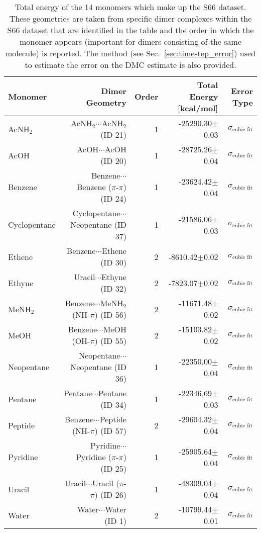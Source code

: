 \begin{table}
\caption{\label{tab:monomer_tot_ene}Total energy of the 14 monomers which make up the S66 dataset. These geometries are taken from specific dimer complexes within the S66 dataset that are identified in the table and the order in which the monomer appears (important for dimers consisting of the same molecule) is reported. The method (see Sec.~\ref{sec:timestep_error}) used to estimate the error on the DMC estimate is also provided.}
\begin{adjustbox}{center}
\begin{tabular}{lrrrr}
\toprule
Monomer & Dimer Geometry & Order & Total Energy [kcal/mol] & Error Type \\ 
\midrule
AcNH$_2$ & AcNH$_2$$\cdots$AcNH$_2$ (ID 21) & 1 & -25290.30$\pm$0.03 & $\sigma_\text{cubic fit}$ \\
AcOH & AcOH$\cdots$AcOH (ID 20) & 1 & -28725.26$\pm$0.04 & $\sigma_\text{cubic fit}$ \\
Benzene & Benzene$\cdots$Benzene ($\pi$-$\pi$) (ID 24) & 1 & -23624.42$\pm$0.04 & $\sigma_\text{cubic fit}$ \\
Cyclopentane & Cyclopentane$\cdots$Neopentane (ID 37) & 1 & -21586.06$\pm$0.03 & $\sigma_\text{cubic fit}$ \\
Ethene & Benzene$\cdots$Ethene (ID 30) & 2 & -8610.42$\pm$0.02 & $\sigma_\text{cubic fit}$ \\
Ethyne & Uracil$\cdots$Ethyne (ID 32) & 2 & -7823.07$\pm$0.02 & $\sigma_\text{cubic fit}$ \\
MeNH$_2$ & Benzene$\cdots$MeNH$_2$ (NH-$\pi$) (ID 56) & 2 & -11671.48$\pm$0.02 & $\sigma_\text{cubic fit}$ \\
MeOH & Benzene$\cdots$MeOH (OH-$\pi$) (ID 55) & 2 & -15103.82$\pm$0.02 & $\sigma_\text{cubic fit}$ \\
Neopentane & Neopentane$\cdots$Neopentane (ID 36) & 1 & -22350.00$\pm$0.04 & $\sigma_\text{cubic fit}$ \\
Pentane & Pentane$\cdots$Pentane (ID 34) & 1 & -22346.69$\pm$0.03 & $\sigma_\text{cubic fit}$ \\
Peptide & Benzene$\cdots$Peptide (NH-$\pi$) (ID 57) & 2 & -29604.32$\pm$0.04 & $\sigma_\text{cubic fit}$ \\
Pyridine & Pyridine$\cdots$Pyridine ($\pi$-$\pi$) (ID 25) & 1 & -25905.64$\pm$0.04 & $\sigma_\text{cubic fit}$ \\
Uracil & Uracil$\cdots$Uracil ($\pi$-$\pi$) (ID 26) & 1 & -48309.04$\pm$0.04 & $\sigma_\text{cubic fit}$ \\
Water & Water$\cdots$Water (ID 1) & 2 & -10799.44$\pm$0.01 & $\sigma_\text{cubic fit}$ \\
\bottomrule
\end{tabular}
\end{adjustbox}
\end{table}